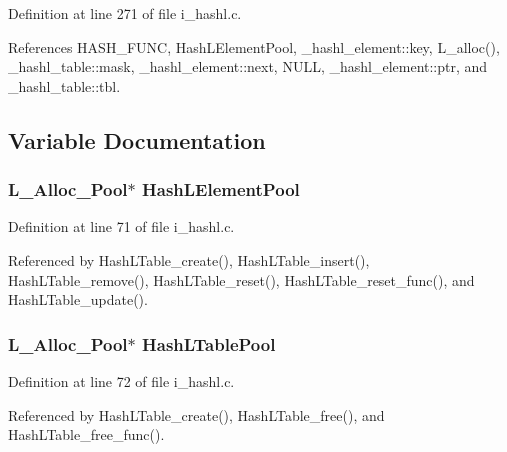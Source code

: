 Definition at line 271 of file i\_\-hashl.c.

References HASH\_\-FUNC, Hash\-LElement\-Pool, \_\-hashl\_\-element::key, L\_\-alloc(), \_\-hashl\_\-table::mask, \_\-hashl\_\-element::next, NULL, \_\-hashl\_\-element::ptr, and \_\-hashl\_\-table::tbl.

\subsection{Variable Documentation}
\subsubsection{\setlength{\rightskip}{0pt plus 5cm}\bf{L\_\-Alloc\_\-Pool}$\ast$ \bf{Hash\-LElement\-Pool}}\label{i__hashl_8h_eaabea78844a0658a3e78d29b54c1013}




Definition at line 71 of file i\_\-hashl.c.

Referenced by Hash\-LTable\_\-create(), Hash\-LTable\_\-insert(), Hash\-LTable\_\-remove(), Hash\-LTable\_\-reset(), Hash\-LTable\_\-reset\_\-func(), and Hash\-LTable\_\-update().
\subsubsection{\setlength{\rightskip}{0pt plus 5cm}\bf{L\_\-Alloc\_\-Pool}$\ast$ \bf{Hash\-LTable\-Pool}}\label{i__hashl_8h_0334d8420644c4cac1a1ad24023b3a44}




Definition at line 72 of file i\_\-hashl.c.

Referenced by Hash\-LTable\_\-create(), Hash\-LTable\_\-free(), and Hash\-LTable\_\-free\_\-func().